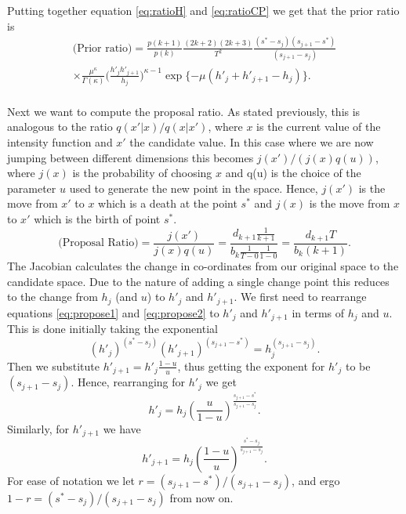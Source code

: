 \documentclass[../main.tex]{subfiles}
\begin{document}
Putting together equation \eqref{eq:ratioH} and \eqref{eq:ratioCP} we get that the prior ratio is
\begin{multline}
\text{(Prior ratio)} = \frac{p(k+1)}{p(k)} \frac{(2k+2)(2k+3)}{T^2} \frac{(s^* - s_j) (s_{j+1} - s^*) }{(s_{j+1} - s_j)}  
 \\ \times \frac{\mu^\kappa}{\Gamma (\kappa)} \bigg(\frac{h'_j h'_{j+1}}{h_j}\bigg)^{\kappa-1}  \exp \{- \mu (h'_j + h'_{j+1} - h_j) \}. 
\end{multline}\\
Next we want to compute the proposal ratio. As stated previously, this is analogous to the ratio $q(x'|x) / q(x|x')$, where $x$ is the current value of the intensity function and $x'$ the candidate value. In this case where we are now jumping between different dimensions this becomes $j(x') / (j(x) q(u) )$, where $j(x)$ is the probability of choosing $x$ and q(u) is the choice of the parameter $u$ used to generate the new point in the space. Hence, $j(x')$ is the move from $x'$ to $x$ which is a death at the point $s^*$ and $j(x)$ is the move from $x$ to $x'$ which is the birth of point $s^*$.
\begin{equation}
\text{(Proposal Ratio)} = \frac{j(x')}{j(x)q(u)} = \frac{d_{k+1} \frac{1}{k+1}}{b_k \frac{1}{T - 0}\frac{1}{1-0}} = \frac{d_{k+1}T}{b_k (k+1)}.
\end{equation} 
The Jacobian calculates the change in co-ordinates from our original space to the candidate space. Due to the nature of adding a single change point this reduces to the change from $h_j$ (and $u$) to $h'_j$ and $h'_{j+1}$. We first need to rearrange equations \eqref{eq:propose1} and \eqref{eq:propose2}   to $h'_j$ and $h'_{j+1}$ in terms of $h_j$ and $u$. This is done initially taking the exponential
\begin{equation}
\left( h'_j \right) ^{ \left(s^* - s_j \right)} \left( h' _{j+1} \right)^{ \left(s_{j+1} - s^* \right)} = h_j^{\left( s_{j+1} - s_j  \right)}.
\end{equation}
Then we substitute $h'_{j+1} = h'_j\frac{1-u}{u}$, thus getting the exponent for $h'_j$ to be $\left( s_{j+1} - s_{j} \right) $. Hence, rearranging for $h'_j$ we get
 \begin{equation}
h'_j = h_j \left( \frac{u}{1-u}\right) ^{\frac{s_{j+1} -s^*}{s_{j+1} - s_j}}.
\end{equation} 
Similarly, for $h'_{j+1}$ we have
\begin{equation}
h'_{j+1} = h_j \left( \frac{1-u}{u}\right) ^{\frac{s^*-s_j}{s_{j+1} - s_j}}.
\end{equation} 
  For ease of notation we let $r = (s_{j+1} - s^*) / (s_{j+1} - s_j)$, and ergo $1-r = (s^* - s_j) / (s_{j+1} - s_j) $ from now on. 
\end{document}
